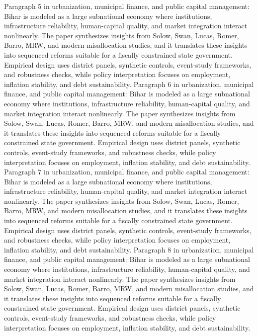 \documentclass[preprint,12pt]{elsarticle}
\begin{document}
Paragraph 5 in urbanization, municipal finance, and public capital management: Bihar is modeled as a large subnational economy where institutions, infrastructure reliability, human-capital quality, and market integration interact nonlinearly. The paper synthesizes insights from Solow, Swan, Lucas, Romer, Barro, MRW, and modern misallocation studies, and it translates these insights into sequenced reforms suitable for a fiscally constrained state government. Empirical design uses district panels, synthetic controls, event-study frameworks, and robustness checks, while policy interpretation focuses on employment, inflation stability, and debt sustainability.
Paragraph 6 in urbanization, municipal finance, and public capital management: Bihar is modeled as a large subnational economy where institutions, infrastructure reliability, human-capital quality, and market integration interact nonlinearly. The paper synthesizes insights from Solow, Swan, Lucas, Romer, Barro, MRW, and modern misallocation studies, and it translates these insights into sequenced reforms suitable for a fiscally constrained state government. Empirical design uses district panels, synthetic controls, event-study frameworks, and robustness checks, while policy interpretation focuses on employment, inflation stability, and debt sustainability.
Paragraph 7 in urbanization, municipal finance, and public capital management: Bihar is modeled as a large subnational economy where institutions, infrastructure reliability, human-capital quality, and market integration interact nonlinearly. The paper synthesizes insights from Solow, Swan, Lucas, Romer, Barro, MRW, and modern misallocation studies, and it translates these insights into sequenced reforms suitable for a fiscally constrained state government. Empirical design uses district panels, synthetic controls, event-study frameworks, and robustness checks, while policy interpretation focuses on employment, inflation stability, and debt sustainability.
Paragraph 8 in urbanization, municipal finance, and public capital management: Bihar is modeled as a large subnational economy where institutions, infrastructure reliability, human-capital quality, and market integration interact nonlinearly. The paper synthesizes insights from Solow, Swan, Lucas, Romer, Barro, MRW, and modern misallocation studies, and it translates these insights into sequenced reforms suitable for a fiscally constrained state government. Empirical design uses district panels, synthetic controls, event-study frameworks, and robustness checks, while policy interpretation focuses on employment, inflation stability, and debt sustainability.
\end{document}
